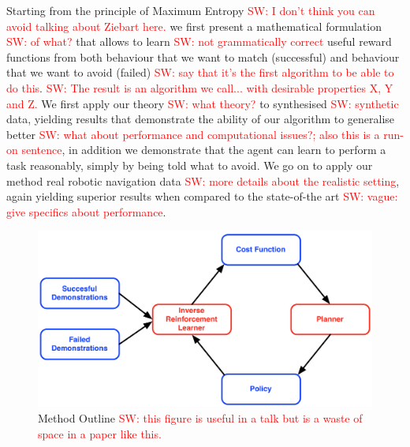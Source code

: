 \documentclass[letterpaper]{article}
\newcommand{\sw}[1]{\textcolor{red}{SW: #1}}
\begin{document}
	 Starting from the principle of Maximum Entropy \cite{jaynes1957information} \sw{I don't think you can avoid talking about Ziebart here.} we first present a mathematical formulation \sw{of what?} that allows to learn \sw{not grammatically correct} useful reward functions from both behaviour that we want to match (successful) and behaviour that we want to avoid (failed) \sw{say that it's the first algorithm to be able to do this}. \sw{The result is an algorithm we call... with desirable properties X, Y and Z.} We first apply our theory \sw{what theory?} to synthesised \sw{synthetic} data, yielding results that demonstrate the ability of our algorithm to generalise better \sw{what about performance and computational issues?; also this is a run-on sentence}, in addition we demonstrate that the agent can learn to perform a task reasonably, simply by being told what to avoid. We go on to apply our method real robotic navigation data \sw{more details about the realistic setting}, again yielding superior results when compared to the state-of-the art \sw{vague: give specifics about performance}. 

	
\begin{figure}[t]
  \centering
  \includegraphics[width=0.9\columnwidth]{images/irlf.png}
  \caption{Method Outline 	\label{fig:IRLoutline} \sw{this figure is useful in a talk but is a waste of space in a paper like this.}}
\end{figure}
\end{document}
